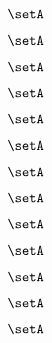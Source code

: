 \begin{forslides}
    \begin{equation}
        \label{eq:slides-translation-90}
        \setA
    \end{equation}

    \begin{equation}
        \label{eq:slides-translation-91}
        \setA
    \end{equation}

    \begin{equation}
        \label{eq:slides-translation-92}
        \setA
    \end{equation}

    \begin{equation}
        \label{eq:slides-translation-93}
        \setA
    \end{equation}

    \begin{equation}
        \label{eq:slides-translation-94}
        \setA
    \end{equation}

    \begin{equation}
        \label{eq:slides-translation-95}
        \setA
    \end{equation}

    \begin{equation}
        \label{eq:slides-translation-96}
        \setA
    \end{equation}

    \begin{equation}
        \label{eq:slides-translation-97}
        \setA
    \end{equation}

    \begin{equation}
        \label{eq:slides-translation-98}
        \setA
    \end{equation}

    \begin{equation}
        \label{eq:slides-translation-99}
        \setA
    \end{equation}
    
    \begin{equation}
        \label{eq:slides-translation-100}
        \setA
    \end{equation}

    \begin{equation}
        \label{eq:slides-translation-111}
        \setA
    \end{equation}

    \begin{equation}
        \label{eq:slides-translation-112}
        \setA
    \end{equation}


\end{forslides}
